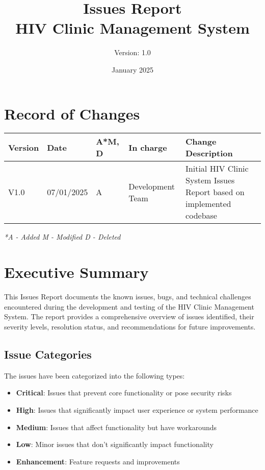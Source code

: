 \documentclass[12pt,a4paper]{article}
\title{\textbf{Issues Report\\HIV Clinic Management System}}
\author{Version: 1.0}
\date{January 2025}
\begin{document}
\maketitle
\thispagestyle{empty}

\newpage

\section*{Record of Changes}

\begin{longtable}{|p{2cm}|p{2cm}|p{1cm}|p{3cm}|p{6cm}|}
\hline
\textbf{Version} & \textbf{Date} & \textbf{A*M, D} & \textbf{In charge} & \textbf{Change Description} \\
\hline
V1.0 & 07/01/2025 & A & Development Team & Initial HIV Clinic System Issues Report based on implemented codebase \\
\hline
\end{longtable}

\textit{*A - Added M - Modified D - Deleted}

\newpage

\tableofcontents

\newpage

\section{Executive Summary}

This Issues Report documents the known issues, bugs, and technical challenges encountered during the development and testing of the HIV Clinic Management System. The report provides a comprehensive overview of issues identified, their severity levels, resolution status, and recommendations for future improvements.

\subsection{Issue Categories}

The issues have been categorized into the following types:

\begin{itemize}
    \item \textbf{Critical}: Issues that prevent core functionality or pose security risks
    \item \textbf{High}: Issues that significantly impact user experience or system performance
    \item \textbf{Medium}: Issues that affect functionality but have workarounds
    \item \textbf{Low}: Minor issues that don't significantly impact functionality
    \item \textbf{Enhancement}: Feature requests and improvements
\end{itemize}
\end{document}
